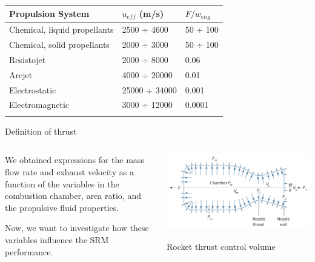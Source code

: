 \documentclass[
  ignorenonframetext,
]{beamer}
\begin{document}
\begin{frame}
\begin{longtable}[]{@{}lll@{}}
\toprule\noalign{}
Propulsion System & \(u_{eff}\) (m/s) & \(F/w_{eng}\) \\
\midrule\noalign{}
\endhead
Chemical, liquid propellants & 2500 ÷ 4600 & 50 ÷ 100 \\
Chemical, solid propellants & 2000 ÷ 3000 & 50 ÷ 100 \\
Resistojet & 2000 ÷ 8000 & 0.06 \\
Arcjet & 4000 ÷ 20000 & 0.01 \\
Electrostatic & 25000 ÷ 34000 & 0.001 \\
Electromagnetic & 3000 ÷ 12000 & 0.0001 \\
\bottomrule\noalign{}
\end{longtable}
\end{frame}

\begin{frame}{Definition of thrust}
\protect\hypertarget{definition-of-thrust}{}
\begin{columns}[T]
\begin{column}{0.5\textwidth}
{We obtained expressions for the mass flow rate and exhaust velocity as
a function of the variables in the combustion chamber, area ratio, and
the propulsive fluid properties. }

{Now, we want to investigate how these variables influence the SRM
performance. }
\end{column}

\begin{column}{0.5\textwidth}
\includegraphics{figs/fig4.1.png}

Rocket thrust control volume
\end{column}
\end{columns}
\end{frame}
\end{document}
